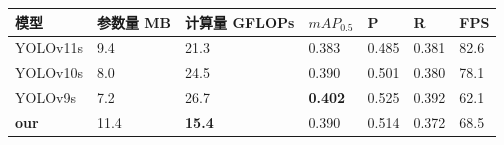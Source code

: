 \begin{table}[htbp]
    \centering
    \captionsetup{font=footnotesize}
    \label{tab:compare_studies_fogvd}
    \begin{tabular}{p{}p{}p{}p{}p{}p{}p{}}
        \toprule
        模型       & 参数量 MB & 计算量 GFLOPs & $mAP_{0.5}$   & P     & R     & FPS \\ 
        \midrule
        YOLOv11s     & 9.4   & 21.3         & 0.383           & 0.485  & 0.381 & 82.6 \\
        YOLOv10s     & 8.0   & 24.5         & 0.390           & 0.501  & 0.380 & 78.1 \\
        YOLOv9s      & 7.2   & 26.7         & \textbf{0.402}           & 0.525  & 0.392 & 62.1 \\
        \textbf{our} & 11.4  & \textbf{15.4} & 0.390 & 0.514  & 0.372 & 68.5 \\
        \bottomrule
    \end{tabular}
\end{table}

